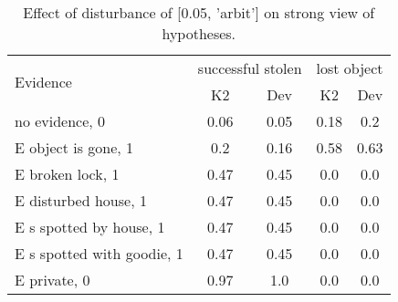 \begin{table}\begin{tabular}{l|cc|cc}\toprule\multirow{2}{*}{Evidence} & \multicolumn{2}{c}{successful stolen}& \multicolumn{2}{c}{lost object}\\& {K2} & {Dev}& {K2} & {Dev}\\\midrule
no evidence, 0 & 0.06&0.05&0.18&0.2\\E object is gone, 1 & 0.2&0.16&\cellcolor{Bittersweet}0.58&\cellcolor{Bittersweet}0.63\\E broken lock, 1 & 0.47&0.45&0.0&0.0\\E disturbed house, 1 & 0.47&0.45&0.0&0.0\\E s spotted by house, 1 & 0.47&0.45&0.0&0.0\\E s spotted with goodie, 1 & 0.47&0.45&0.0&0.0\\E private, 0 & 0.97&1.0&0.0&0.0\\\bottomrule\end{tabular}\caption{Effect of disturbance of [0.05, 'arbit'] on strong view of hypotheses.}\end{table}